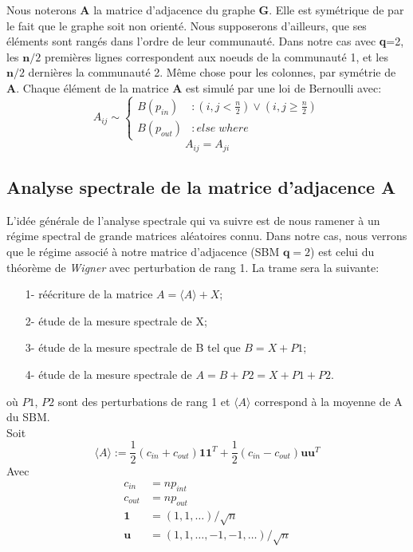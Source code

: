 Nous noterons \textbf{A} la matrice d'adjacence du graphe \textbf{G}.
Elle est symétrique de par le fait que le graphe soit non orienté.
Nous supposerons d'ailleurs, que ses éléments sont rangés dans l'ordre de leur communauté.
Dans notre cas avec \textbf{q}=2, les $\mathbf{n}/2$ premières lignes correspondent aux noeuds de la communauté 1, et les $\mathbf{n}/2$ dernières la communauté 2.
Même chose pour les colonnes, par symétrie de \textbf{A}.
Chaque élément de la matrice \textbf{A} est simulé par une loi de Bernoulli avec: 
\begin{equation} 
 A_{ij} \sim \left\{
  \begin{array}{lr}
    B(p_{in}) & : (i,j < \frac{n}{2}) \lor (i,j \ge \frac{n}{2}) \\
    B(p_{out}) & : else \; where
  \end{array}
\right.\nonumber
\end{equation}
\begin{equation} 
A_{ij} = A_{ji}\nonumber
\end{equation}


\subsection{Analyse spectrale de la matrice d'adjacence \textbf{A}}
L'idée générale de l'analyse spectrale qui va suivre est de nous ramener à un régime spectral de grande matrices aléatoires connu. 
Dans notre cas, nous verrons que le régime associé à notre matrice d'adjacence (SBM $\textbf{q}=2$) est celui du théorème de \textit{Wigner} avec perturbation de rang 1.
La trame sera la suivante:
\begin{itemize}
 	\item[1-] réécriture de la matrice $A = \langle A \rangle + X$;
 	\item[2-] étude de la mesure spectrale de X;
 	\item[3-] étude de la mesure spectrale de B tel que $B = X + P1$;
 	\item[4-] étude de la mesure spectrale de $A = B + P2 = X + P1 + P2$.
 \end{itemize} 
où $P1$, $P2$ sont des perturbations de rang 1 et $\langle A \rangle$ correspond à la moyenne de A du SBM.\\

Soit
\begin{equation} 
\langle A \rangle := \frac{1}{2}(c_{in} + c_{out})\mathbf{11}^T + \frac{1}{2}(c_{in} - c_{out})\mathbf{uu}^T \label{eq:1}
\end{equation}
Avec
\begin{align*}
c_{in} &= np_{int} \\
c_{out} &= np_{out}\\
\mathbf{1} &= (1, 1, \ldots)/\sqrt{n}\\
\mathbf{u} &= (1, 1, \ldots, -1, -1, \ldots)/\sqrt{n}
\end{align*}

